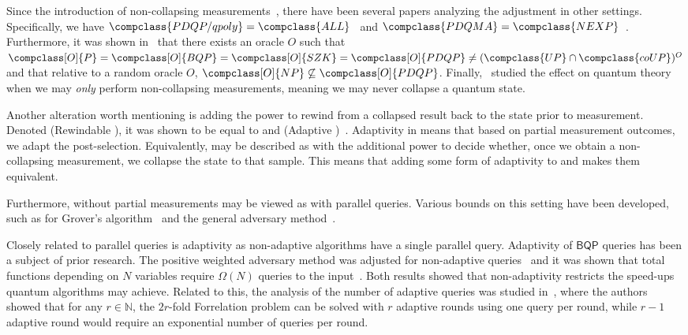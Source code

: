 Since the introduction of non-collapsing measurements~\cite{space_above_bqp}, there have been several papers analyzing the adjustment in other settings. Specifically, we have $\compclass{PDQP/qpoly}=\compclass{ALL}$~\cite{pdqpqpoly_equals_all} and $\compclass{PDQMA} = \compclass{NEXP}$~\cite{pdqma_equals_nexp, pdqma_single}. Furthermore, it was shown in~\cite{pdqp_oracle_separation} that there exists an oracle $O$ such that $\compclass[O]{P} = \compclass[O]{BQP} = \compclass[O]{SZK} =\compclass[O]{PDQP} \neq (\compclass{UP}\cap \compclass{coUP})^O$ and that relative to a random oracle $O$, $\compclass[O]{NP}\not \subseteq \compclass[O]{PDQP}$. Finally,~\cite{no_collapsing_measurement} studied the effect on quantum theory when we may \emph{only} perform non-collapsing measurements, meaning we may never collapse a quantum state.

Another alteration worth mentioning is adding the power to rewind from a collapsed result back to the state prior to measurement. Denoted  (Rewindable \bqpname), it was shown to be equal to \copybqpname and  (Adaptive \postbqpname)~\cite{rewindable_bqp}. Adaptivity in  means that based on partial measurement outcomes, we adapt the post-selection. Equivalently,  may be described as \pdqpname with the additional power to decide whether, once we obtain a non-collapsing measurement, we collapse the state to that sample. This means that adding some form of adaptivity to \postbqpname and \pdqpname makes them equivalent.

Furthermore, \pdqpname without partial measurements may be viewed as \bqpname with parallel queries. Various bounds on this setting have been developed, such as for Grover's algorithm~\cite{grovers_search_optimal} and the general adversary method~\cite{optimal_parallel_query}.

Closely related to parallel queries is adaptivity as non-adaptive algorithms have a single parallel query. Adaptivity of $\mathsf{BQP}$ queries has been a subject of prior research. The positive weighted adversary method was adjusted for non-adaptive queries~\cite{nonadaptive_weighted_adversary} and it was shown that total functions depending on $N$ variables require $\Omega(N)$ queries to the input~\cite{nonadaptive_query_complexity}. Both results showed that non-adaptivity restricts the speed-ups quantum algorithms may achieve. Related to this, the analysis of the number of adaptive queries was studied in~\cite{power_of_adaptivity}, where the authors showed that for any $r\in \mathbb{N}$, the $2r$-fold Forrelation problem can be solved with $r$ adaptive rounds using one query per round, while $r-1$ adaptive round would require an exponential number of queries per round.

